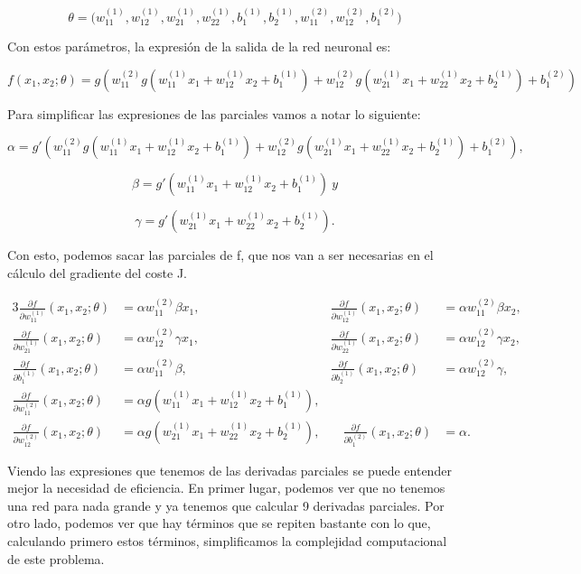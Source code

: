 $$\theta = \Big(w_{11}^{(1)}, w_{12}^{(1)}, w_{21}^{(1)}, w_{22}^{(1)}, b_1^{(1)}, b_2^{(1)}, w_{11}^{(2)}, w_{12}^{(2)}, b_1^{(2)}\Big)$$

Con estos parámetros, la expresión de la salida de la red neuronal es:

$$f(x_1 , x_2 ; \theta) = g(w_{11}^{(2)}g(w_{11}^{(1)}x_1 + w_{12}^{(1)}x_2 + b_1^{(1)}) + w_{12}^{(2)}g(w_{21}^{(1)}x_1 + w_{22}^{(1)}x_2 + b_2^{(1)}) + b_1^{(2)})$$

Para simplificar las expresiones de las parciales vamos a notar lo siguiente:

$$\alpha = g' (w_{11}^{(2)}g(w_{11}^{(1)}x_1 + w_{12}^{(1)}x_2 + b_1^{(1)}) + w_{12}^{(2)} g(w_{21}^{(1)}x_1 + w_{22}^{(1)}x_2 + b_2^{(1)}) + b_1^{(2)}),$$

$$\beta =  g'(w_{11}^{(1)}x_1 + w_{12}^{(1)}x_2 + b_1^{(1)}) \ y$$

$$\gamma =  g'(w_{21}^{(1)}x_1 + w_{22}^{(1)}x_2 + b_2^{(1)}).$$

Con esto, podemos sacar las parciales de f, que nos van a ser necesarias en el cálculo del gradiente del coste J.

\footnotesize
\begin{alignat*}{3}
\frac{\partial f}{\partial w_{11}^{(1)}}(x_1,x_2;\theta)&=\alpha w_{11}^{(2)}\beta x_1,\quad&
\frac{\partial f}{\partial w_{12}^{(1)}}(x_1,x_2;\theta)&=\alpha w_{11}^{(2)}\beta x_2,\\
\frac{\partial f}{\partial w_{21}^{(1)}}(x_1,x_2;\theta)&=\alpha w_{12}^{(2)}\gamma x_1,\quad&
\frac{\partial f}{\partial w_{22}^{(1)}}(x_1,x_2;\theta)&=\alpha w_{12}^{(2)}\gamma x_2,\\
\frac{\partial f}{\partial b_{1}^{(1)}}(x_1,x_2;\theta)&=\alpha w_{11}^{(2)}\beta, \quad&
\frac{\partial f}{\partial b_{2}^{(1)}}(x_1,x_2;\theta)&=\alpha w_{12}^{(2)}\gamma, \\
\frac{\partial f}{\partial w_{11}^{(2)}}(x_1,x_2;\theta)&=\alpha g(w_{11}^{(1)}x_{1}+w_{12}^{(1)}x_2 + b_1^{(1)}),&&\\
\frac{\partial f}{\partial w_{12}^{(2)}}(x_1,x_2;\theta)&=\alpha g(w_{21}^{(1)}x_{1}+w_{22}^{(1)}x_2 + b_2^{(1)}),&\quad
\frac{\partial f}{\partial b_{1}^{(2)}}(x_1,x_2;\theta)&=\alpha.
\end{alignat*}
\normalsize

Viendo las expresiones que tenemos de las derivadas parciales se puede entender mejor la necesidad de eficiencia. En primer lugar, podemos ver que no tenemos una red para nada grande y ya tenemos que calcular 9 derivadas parciales. Por otro lado, podemos ver que hay términos que se repiten bastante con lo que, calculando primero estos términos, simplificamos la complejidad computacional de este problema.

